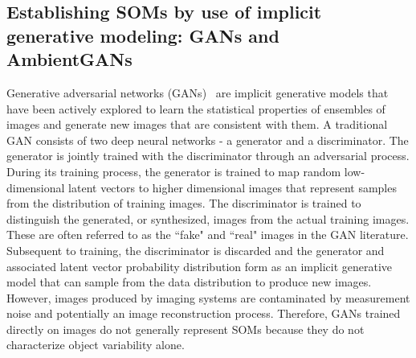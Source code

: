 \documentclass[journal]{IEEEtran}
\begin{document}
\subsection{Establishing SOMs by use of implicit generative
modeling: GANs and AmbientGANs}
\label{ssec:AmGANforSOM}

Generative adversarial networks (GANs)~\cite{goodfellow2014generative, arjovsky2017towards,arora2017do,denton2015deep,radford2015unsupervised,
salimans2016improved, li2019misGAN, shrivastava2015learning, arjovsky2017wasserstein, gulrajani2017improved, brock2018large} 
 are implicit generative models that have been actively explored to
learn the statistical properties of ensembles of images and generate new images
that are consistent with them.
A traditional GAN consists of two deep neural networks - a  generator and a discriminator. 
The generator is jointly trained with the discriminator through an adversarial process. 
During its training process, the generator is trained to map random low-dimensional latent vectors
to higher dimensional images that represent samples from the distribution of training images.
The discriminator is trained to distinguish the generated, or synthesized, images from
 the actual training images. These are often referred to as the ``fake" and ``real" images in the
GAN literature. 
Subsequent to training, the discriminator is discarded and the generator and associated
latent vector probability distribution form as an implicit
generative model that can sample from the data distribution to produce new images.
However, images produced by  imaging systems are contaminated by measurement
noise and potentially an image reconstruction process.  Therefore, GANs trained
directly on images do not generally represent SOMs because they do not
characterize object variability alone.
\end{document}
